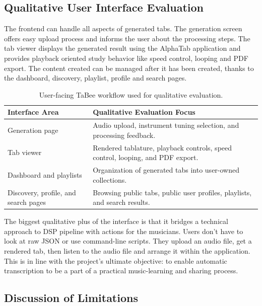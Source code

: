 \documentclass[a4paper, 12pt, titlepage]{article}
\begin{document}
\subsection{Qualitative User Interface Evaluation}

The frontend can handle all aspects of generated tabs. The generation screen offers easy upload process and informs the user about the processing steps. The tab viewer displays the generated result using the AlphaTab application and provides playback oriented study behavior like speed control, looping and PDF export. The content created can be managed after it has been created, thanks to the dashboard, discovery, playlist, profile and search pages.

\begin{table}[H]
    \centering
    \begin{tabular}{|p{}|p{}|}
        \hline
        \textbf{Interface Area} & \textbf{Qualitative Evaluation Focus} \\
        \hline
        Generation page & Audio upload, instrument tuning selection, and processing feedback. \\
        \hline
        Tab viewer & Rendered tablature, playback controls, speed control, looping, and PDF export. \\
        \hline
        Dashboard and playlists & Organization of generated tabs into user-owned collections. \\
        \hline
        Discovery, profile, and search pages & Browsing public tabs, public user profiles, playlists, and search results. \\
        \hline
    \end{tabular}
    \caption{User-facing TaBee workflow used for qualitative evaluation.}
    \label{tab:tabee_qualitative_workflow}
\end{table}

The biggest qualitative plus of the interface is that it bridges a technical approach to DSP pipeline with actions for the musicians. Users don't have to look at raw JSON or use command-line scripts. They upload an audio file, get a rendered tab, then listen to the audio file and arrange it within the application. This is in line with the project's ultimate objective: to enable automatic transcription to be a part of a practical music-learning and sharing process.

\subsection{Discussion of Limitations}
\end{document}
